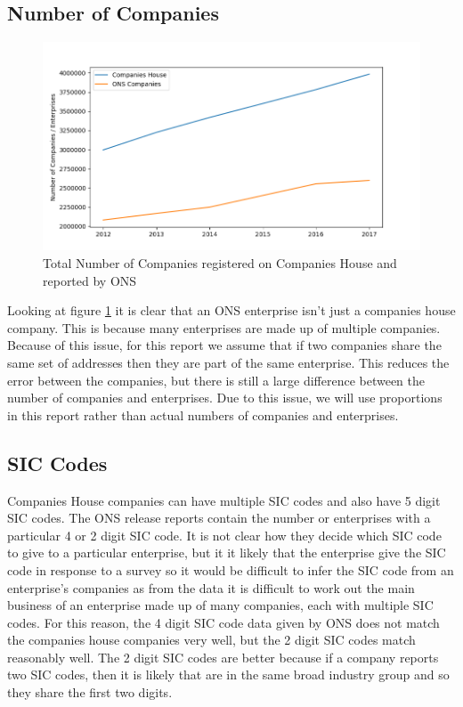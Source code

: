 \documentclass[a4paper,10pt]{article}
\begin{document}
   \subsection{Number of Companies}
   \label{company_enterprise_error}

   \begin{figure}[h]
      \begin{center}
         \caption{Total Number of Companies registered on Companies House and reported by ONS}
         \label{ch_vs_ons}
         \includegraphics[width=12cm]{graphs/companies_house_vs_ons/companies_house_vs_ons}
      \end{center}
   \end{figure}

   Looking at figure \ref{ch_vs_ons} it is clear that an ONS enterprise isn't just a companies house company. This is because many enterprises are made up of multiple companies. Because of this issue, for this report we assume that if two companies share the same set of addresses then they are part of the same enterprise. This reduces the error between the companies, but there is still a large difference between the number of companies and enterprises. Due to this issue, we will use proportions in this report rather than actual numbers of companies and enterprises.

   \subsection{SIC Codes}

   Companies House companies can have multiple SIC codes and also have 5 digit SIC codes. The ONS release reports contain the number or enterprises with a particular 4 or 2 digit SIC code. It is not clear how they decide which SIC code to give to a particular enterprise, but it it likely that the enterprise give the SIC code in response to a survey so it would be difficult to infer the SIC code from an enterprise's companies as from the data it is difficult to work out the main business of an enterprise made up of many companies, each with multiple SIC codes. For this reason, the 4 digit SIC code data given by ONS does not match the companies house companies very well, but the 2 digit SIC codes match reasonably well. The 2 digit SIC codes are better because if a company reports two SIC codes, then it is likely that are in the same broad industry group and so they share the first two digits.
\end{document}
